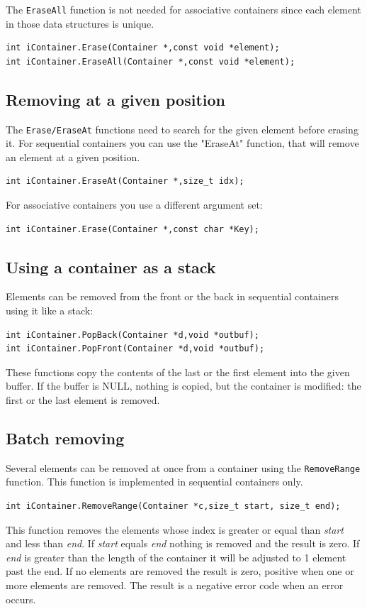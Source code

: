 \documentclass[12pt,a4paper]{memoir} %
\begin{document}
The \texttt{EraseAll} function is not needed for associative containers since each element in those data structures is unique.
\begin{verbatim}
int iContainer.Erase(Container *,const void *element);
int iContainer.EraseAll(Container *,const void *element);
\end{verbatim}
\subsection{Removing at a given position}
\noindent The \texttt{Erase/EraseAt} functions need to search for the given element before erasing it. For sequential containers you can use the "EraseAt" function, that will remove an element at a given position.
\begin{verbatim}
int iContainer.EraseAt(Container *,size_t idx);
\end{verbatim}
\noindent
For associative containers you use a different argument set:
\begin{verbatim}
int iContainer.Erase(Container *,const char *Key);
\end{verbatim}
\subsection{Using a container as a stack}
Elements can be removed from the front or the back in sequential containers using it like a stack:
\begin{verbatim}
int iContainer.PopBack(Container *d,void *outbuf);
int iContainer.PopFront(Container *d,void *outbuf);
\end{verbatim}
These functions copy the contents of the last or the first element into the given buffer. If the buffer is NULL, nothing is copied, but the
container is modified: the first or the last element is removed.
\subsection{Batch removing}
Several elements can be removed at once from a container using the \texttt{RemoveRange} function. This function is implemented in sequential
containers only.
\begin{verbatim}
int iContainer.RemoveRange(Container *c,size_t start, size_t end);
\end{verbatim}
This function removes the elements whose index is greater or equal than \textsl{start} and less than \textsl{end}. If \textsl{start} equals \textsl{end}
nothing is removed and the result is zero. If \textsl{end} is greater than the length of the container it will be adjusted to 1 element past the
end. If no elements are removed the result is zero, positive when one or more elements are removed. The result is a negative error code when an
error occurs.
\end{document}
